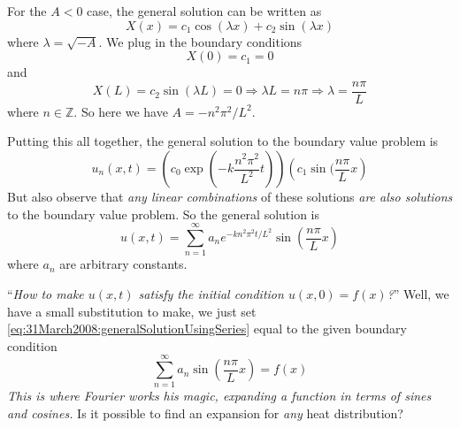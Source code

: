 For the $A<0$ case, the general solution can be written as
\begin{equation}
X(x) = c_{1}\cos(\lambda x) + c_{2}\sin(\lambda x)
\end{equation}
where $\lambda=\sqrt{-A}$. We plug in the boundary
conditions
\begin{equation}
X(0) = c_1 = 0
\end{equation}
and
\begin{equation}
X(L) = c_{2}\sin(\lambda L) = 0\Rightarrow \lambda L = n\pi
\Rightarrow \lambda = \frac{n\pi}{L}
\end{equation}
where $n\in\mathbb{Z}$. So here we have $A=-n^{2}\pi^{2}/L^{2}$.

Putting this all together, the general solution to the
boundary value problem is
\begin{equation}
u_{n}(x,t) =
\left(c_{0}\exp(-k\frac{n^{2}\pi^{2}}{L^{2}}t)\right)\left(c_{1}\sin(\frac{n\pi}{L}x\right)
\end{equation}
But also observe that \emph{any linear combinations} of
these solutions \emph{are also solutions} to the boundary
value problem. So the general solution is
\begin{equation}\label{eq:31March2008:generalSolutionUsingSeries}
u(x,t) =
\sum^{\infty}_{n=1}a_{n}e^{-kn^{2}\pi^{2}t/L^{2}}\sin\left(\frac{n\pi}{L}x\right)
\end{equation}
where $a_{n}$ are arbitrary constants.

``\emph{How to make $u(x,t)$ satisfy the initial condition
  $u(x,0)=f(x)$?}'' Well, we have a small substitution to
make, we just set
\eqref{eq:31March2008:generalSolutionUsingSeries} equal to
the given boundary condition
\begin{equation}
\sum^{\infty}_{n=1}a_{n}\sin\left(\frac{n\pi}{L}x\right) =
f(x)
\end{equation}
\emph{This is where Fourier works his magic, expanding a
  function in terms of sines and cosines.} Is it possible to find an expansion for \emph{any} heat distribution?
